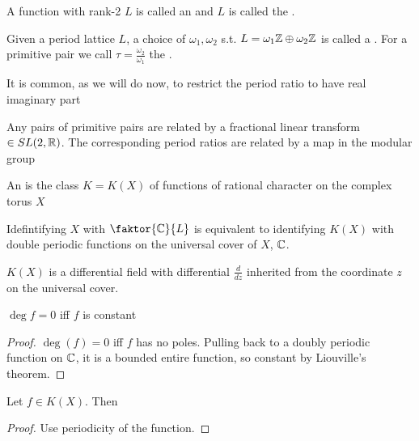 \documentclass{article}
\begin{document}
\begin{definition}
	A function with rank-2 $L$ is called an  and $L$ is called the . 
\end{definition}

\begin{definition}
	Given a period lattice $L$, a choice of $\omega_1, \omega_2$ s.t.  $L = \omega_1 \mathbb{Z} \oplus \omega_2 \mathbb{Z}$ is called a . For a primitive pair we call $\tau = \frac{\omega_2}{\omega_1}$ the . 
\end{definition}

It is common, as we will do now, to restrict the period ratio to have real imaginary part

\begin{prop}
	Any pairs of primitive pairs are related by a fractional linear transform $\in SL(2,\mathbb{R})$. The corresponding period ratios are related by a map in the modular group
\end{prop}

\begin{definition}
	An  is the class $K =K(X)$ of functions of rational character on the complex torus $X$
\end{definition}

\begin{remark}
	Idefintifying $X$ with $\faktor{\mbb{C}}{L}$ is equivalent to identifying $K(X)$ with double periodic functions on the universal cover of $X$, $\mathbb{C}$.
\end{remark}

\begin{prop}
	$K(X)$ is a differential field with differential $\frac{d}{dz}$ inherited from the coordinate $z$ on the universal cover.  
\end{prop}

\begin{prop}
	$\deg f = 0$ iff $f$ is constant
\end{prop}
\begin{proof}
	$\deg(f) = 0$ iff $f$ has no poles. Pulling back to a doubly periodic function on $\mathbb{C}$, it is a bounded entire function, so constant by Liouville's theorem. 
\end{proof}

\begin{lemma}
	Let $f \in K(X)$. Then 
\end{lemma}
\begin{proof}
	Use periodicity of the function. 
\end{proof}
\end{document}
